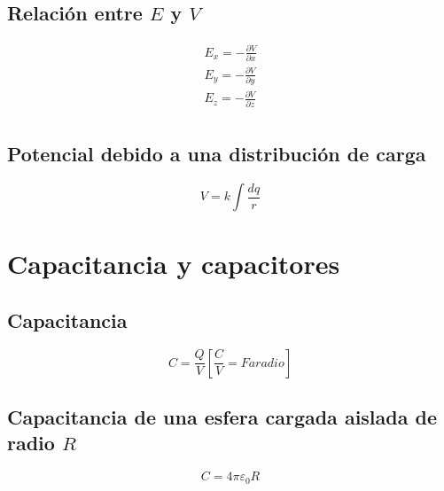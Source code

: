 \documentclass{report}
\begin{document}
    \subsection*{Relación entre $E$ y $V$}

      \begin{align*}
        E_x=-\frac{\partial V}{\partial x}\\
        E_y=-\frac{\partial V}{\partial y}\\
        E_z=-\frac{\partial V}{\partial z}\\
      \end{align*}

    \subsection*{Potencial debido a una distribución de carga}

      \begin{equation*}
        V=k\int\frac{dq}{r}
      \end{equation*}

  \section*{Capacitancia y capacitores}

    \subsection*{Capacitancia}

      \begin{equation*}
        C=\frac{Q}{V}\left[\frac{C}{V}=Faradio\right]
      \end{equation*}

    \subsection*{Capacitancia de una esfera cargada aislada de radio $R$}

      \begin{equation*}
        C=4\pi\varepsilon_0R
      \end{equation*}
\end{document}
